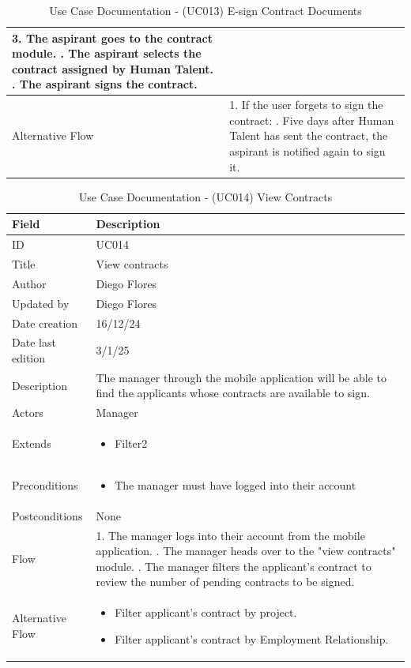 \documentclass{scrreprt}
\begin{document}
\begin{table}[H]
\begin{tabular}{|p{3cm}|p{10cm}|}
		3. The aspirant goes to the contract module. \newline
		4. The aspirant selects the contract assigned by Human Talent. \newline
		5. The aspirant signs the contract. \\ \hline
		Alternative Flow & 
		1. If the user forgets to sign the contract: \newline
		2. Five days after Human Talent has sent the contract, the aspirant is notified again to sign it. \\ \hline
	\end{tabular}
	\caption{Use Case Documentation - (UC013) E-sign Contract Documents}
	\label{table:UC013}
\end{table}

\begin{table}[H]
	\centering
	\begin{tabular}{|p{3cm}|p{10cm}|}
		\hline
		\textbf{Field} & \textbf{Description} \\ \hline
		ID & UC014 \\ \hline
		Title & View contracts \\ \hline
		Author & Diego Flores \\ \hline
		Updated by & Diego Flores \\ \hline
		Date creation & 16/12/24 \\ \hline
		Date last edition & 3/1/25 \\ \hline
		Description & 
		The manager through the mobile application will be able to find the applicants whose contracts are available to sign. \\ \hline
		Actors & Manager \\ \hline
		Extends & 
		\begin{itemize}
			\item Filter2
		\end{itemize} \\ \hline
		Preconditions & 
		\begin{itemize}
			\item The manager must have logged into their account
		\end{itemize} \\ \hline
		Postconditions & 
		None \\ \hline
		Flow & 
		1. The manager logs into their account from the mobile application. \newline
		2. The manager heads over to the "view contracts" module. \newline
		3. The manager filters the applicant's contract to review the number of pending contracts to be signed. \\ \hline
		Alternative Flow & 
		\begin{itemize}
			\item Filter applicant's contract by project.
			\item Filter applicant's contract by Employment Relationship.
		\end{itemize} \\ \hline
	\end{tabular}
	\caption{Use Case Documentation - (UC014) View Contracts}
	\label{table:UC014}
\end{table}
\end{document}
